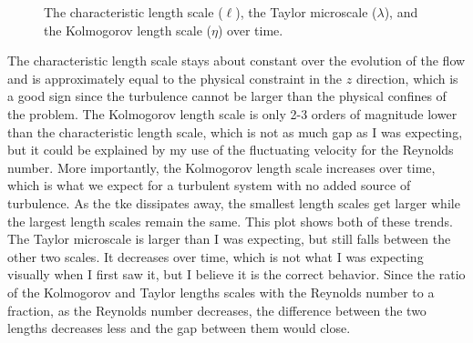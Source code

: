 \documentclass[11pt]{article}
\begin{document}
\begin{enumerate}
\begin{figure}[htbp]
		\caption{The characteristic length scale ($\ell$), the Taylor microscale ($\lambda$), and the Kolmogorov length scale ($\eta$) over time.}
		\label{fig:length}
	\end{figure}
    The characteristic length scale stays about constant over the evolution of the flow and is approximately equal to the physical constraint in the $z$ direction, which is a good sign since the turbulence cannot be larger than the physical confines of the problem. The Kolmogorov length scale is only 2-3 orders of magnitude lower than the characteristic length scale, which is not as much gap as I was expecting, but it could be explained by my use of the fluctuating velocity for the Reynolds number. More importantly, the Kolmogorov length scale increases over time, which is what we expect for a turbulent system with no added source of turbulence. As the tke dissipates away, the smallest length scales get larger while the largest length scales remain the same. This plot shows both of these trends. The Taylor microscale is larger than I was expecting, but still falls between the other two scales. It decreases over time, which is not what I was expecting visually when I first saw it, but I believe it is the correct behavior. Since the ratio of the Kolmogorov and Taylor lengths scales with the Reynolds number to a fraction, as the Reynolds number decreases, the difference between the two lengths decreases less and the gap between them would close.
    

\end{enumerate}
\end{document}
